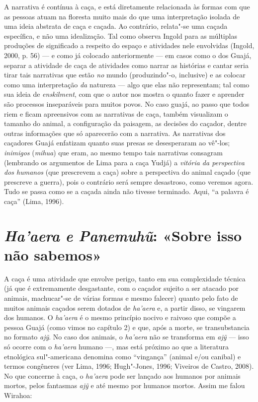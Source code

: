 A narrativa é contínua à caça, e está diretamente relacionada às formas
com que as pessoas atuam na floresta muito mais do que uma interpretação
isolada de uma ideia abstrata de caça e caçada. Ao contrário, relata"-se
uma caçada específica, e não uma idealização. Tal como observa Ingold
para as múltiplas produções de significado a respeito do espaço e
atividades nele envolvidas (Ingold, 2000, p. 56) --- e como já colocado
anteriormente --- em casos como o dos Guajá, separar a atividade de caça
de atividades como narrar as histórias e cantar seria tirar tais
narrativas que estão \emph{no} mundo (produzindo"-o, inclusive) e as
colocar como uma interpretação \emph{da} natureza --- algo que elas não
representam; tal como sua ideia de \emph{enskilment}, com que o autor
nos mostra o quanto fazer e aprender são processos inseparáveis para
muitos povos. No caso guajá, ao passo que todos riem e ficam apreensivos
com as narrativas de caça, também visualizam o tamanho do animal, a
configuração da paisagem, as decisões do caçador, dentre outras
informações que só aparecerão com a narrativa. As narrativas dos
caçadores Guajá enfatizam quanto suas presas se desesperaram ao vê"-los;
\emph{inimigos} (\emph{mihua}) que eram, ao mesmo tempo tais narrativas
consagram (lembrando os argumentos de Lima para a caça Yudjá) a
\emph{vitória da perspectiva dos humanos} (que prescrevem a caça) sobre
a perspectiva do animal caçado (que prescreve a guerra), pois o
contrário será sempre desastroso, como veremos agora. Tudo se passa como
se a caçada ainda não tivesse terminado. Aqui, ``a palavra é caça'' (Lima,
1996).

\section{\emph{Ha'aera e Panemuhũ}: «Sobre isso não sabemos»}

A caça é uma atividade que envolve perigo, tanto em sua complexidade
técnica (já que é extremamente desgastante, com o caçador sujeito a ser
atacado por animais, machucar"-se de várias formas e mesmo falecer)
quanto pelo fato de muitos animais caçados serem dotados de
\emph{ha'aera} e, a partir disso, se vingarem dos humanos. O
\emph{ha'aera} é o mesmo princípio nocivo e raivoso que compõe a pessoa
Guajá (como vimos no capítulo 2) e que, após a morte, se transubstancia
no formato \emph{ajỹ}. No caso dos animais, o \emph{ha'aera} não se
transforma em \emph{ajỹ} --- isso só ocorre com o \emph{ha'aera} humano ---,
mas está próximo ao que a literatura etnológica sul"-americana denomina
como ``vingança'' (animal e/ou canibal) e termos congêneres (ver Lima,
1996; Hugh"-Jones, 1996; Viveiros de Castro, 2008). No que concerne à
caça, o \emph{ha'aera} pode ser lançado aos humanos por animais mortos,
pelos fantasmas \emph{ajỹ} e até mesmo por humanos mortos. Assim me
falou Wirahoa:

